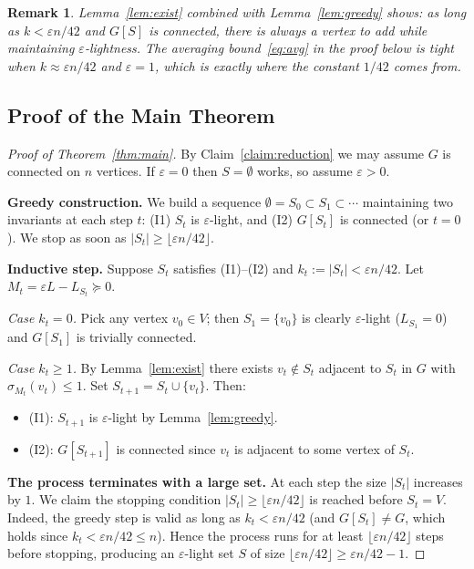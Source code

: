 \documentclass[12pt]{article}
\newtheorem{remark}[theorem]{Remark}
\begin{document}
\begin{remark}
Lemma~\ref{lem:exist} combined with Lemma~\ref{lem:greedy} shows: as long as
$k < \varepsilon n/42$ and $G[S]$ is connected, there is always a vertex to add
while maintaining $\varepsilon$-lightness.  The averaging bound~\eqref{eq:avg}
in the proof below is tight when $k \approx \varepsilon n/42$ and $\varepsilon = 1$,
which is exactly where the constant $1/42$ comes from.
\end{remark}

\subsection*{Proof of the Main Theorem}

\begin{proof}[Proof of Theorem~\ref{thm:main}]
By Claim~\ref{claim:reduction} we may assume $G$ is connected on $n$ vertices.
If $\varepsilon=0$ then $S=\emptyset$ works, so assume $\varepsilon>0$.

\medskip\noindent\textbf{Greedy construction.}
We build a sequence $\emptyset = S_0 \subset S_1\subset\cdots$ maintaining two
invariants at each step $t$: (I1) $S_t$ is $\varepsilon$-light, and (I2) $G[S_t]$
is connected (or $t=0$).  We stop as soon as $|S_t|\geq\lfloor\varepsilon n/42\rfloor$.

\medskip\noindent\textbf{Inductive step.}  Suppose $S_t$ satisfies (I1)--(I2) and
$k_t := |S_t| < \varepsilon n/42$.  Let $M_t = \varepsilon L - L_{S_t}\succeq 0$.

\textit{Case $k_t=0$.}  Pick any vertex $v_0\in V$; then $S_1=\{v_0\}$ is clearly
$\varepsilon$-light ($L_{S_1}=0$) and $G[S_1]$ is trivially connected.

\textit{Case $k_t\geq 1$.}  By Lemma~\ref{lem:exist} there exists $v_t\notin S_t$
adjacent to $S_t$ in $G$ with $\sigma_{M_t}(v_t)\leq 1$.
Set $S_{t+1}=S_t\cup\{v_t\}$.  Then:
\begin{itemize}
  \item (I1): $S_{t+1}$ is $\varepsilon$-light by Lemma~\ref{lem:greedy}.
  \item (I2): $G[S_{t+1}]$ is connected since $v_t$ is adjacent to some vertex of $S_t$.
\end{itemize}

\medskip\noindent\textbf{The process terminates with a large set.}
At each step the size $|S_t|$ increases by $1$.  We claim the stopping condition
$|S_t|\geq\lfloor\varepsilon n/42\rfloor$ is reached before $S_t = V$.
Indeed, the greedy step is valid as long as $k_t < \varepsilon n/42$ (and $G[S_t]\neq G$,
which holds since $k_t < \varepsilon n/42 \leq n$).  Hence the process runs for at
least $\lfloor\varepsilon n/42\rfloor$ steps before stopping, producing an
$\varepsilon$-light set $S$ of size $\lfloor\varepsilon n/42\rfloor\geq\varepsilon n/42 - 1$.


\end{proof}
\end{document}
